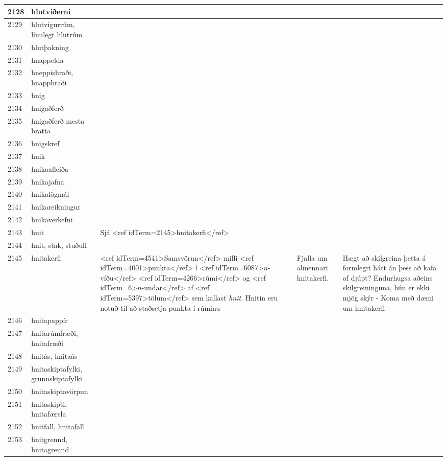 \begin{longtable}{p{}|p{}|p{}|p{}|p{}}
2128 & hlutvíðerni &  &  &  \\
\hline
2129 & hlutvigurrúm, línulegt hlutrúm &  &  &  \\
\hline
2130 & hlutþakning &  &  &  \\
\hline
2131 & hnappelda &  &  &  \\
\hline
2132 & hneppishraði, hnapphraði &  &  &  \\
\hline
2133 & hnig &  &  &  \\
\hline
2134 & hnigaðferð &  &  &  \\
\hline
2135 & hnigaðferð mesta bratta &  &  &  \\
\hline
2136 & hnigskref &  &  &  \\
\hline
2137 & hnik &  &  &  \\
\hline
2138 & hnikaafleiða &  &  &  \\
\hline
2139 & hnikajafna &  &  &  \\
\hline
2140 & hnikalögmál &  &  &  \\
\hline
2141 & hnikareikningur &  &  &  \\
\hline
2142 & hnikaverkefni &  &  &  \\
\hline
2143 & hnit & Sjá <ref idTerm=2145>hnitakerfi</ref> &  &  \\
\hline
2144 & hnit, stak, stuðull &  &  &  \\
\hline
2145 & hnitakerfi & <ref idTerm=4541>Samsvörun</ref> milli <ref idTerm=4001>punkta</ref> í <ref idTerm=6087>$n$-víðu</ref> <ref idTerm=4266>rúmi</ref> og <ref idTerm=6>$n$-undar</ref> af <ref idTerm=5397>tölum</ref> sem kallast \textit{hnit}. Hnitin eru notuð til að staðsetja punkta í rúminu & Fjalla um almennari hnitakerfi. & Hægt að skilgreina þetta á formlegri hátt án þess að kafa of djúpt? Endurhugsa aðeins skilgreininguna, hún er ekki mjög skýr - Koma með dæmi um hnitakerfi \\
\hline
2146 & hnitapappír &  &  &  \\
\hline
2147 & hnitarúmfræði, hnitafræði &  &  &  \\
\hline
2148 & hnitás, hnitaás &  &  &  \\
\hline
2149 & hnitaskiptafylki, grunnskiptafylki &  &  &  \\
\hline
2150 & hnitaskiptavörpun &  &  &  \\
\hline
2151 & hnitaskipti, hnitafærsla &  &  &  \\
\hline
2152 & hnitfall, hnitafall &  &  &  \\
\hline
2153 & hnitgrennd, hnitagrennd &  &  &  \\

\end{longtable}
